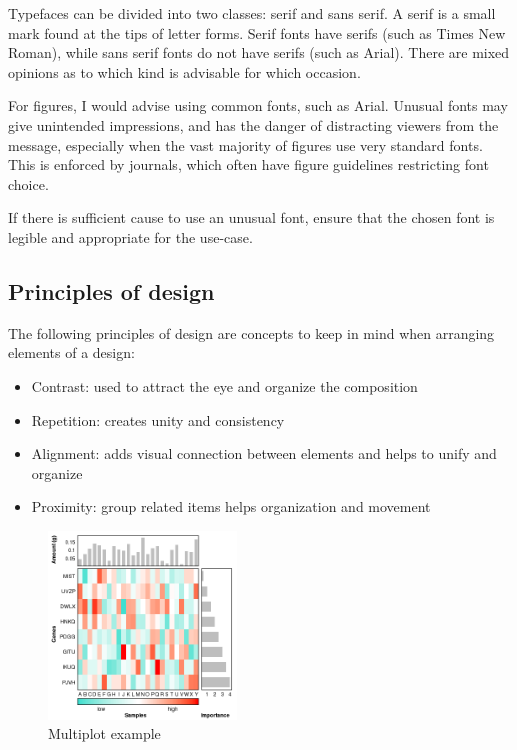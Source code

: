 \documentclass[letterpaper]{article}\usepackage[]{graphicx}\usepackage[]{color}
\begin{document}
Typefaces can be divided into two classes: serif and \textsf{sans serif}. A serif is a small mark found at the tips of letter forms. Serif fonts have serifs (such as Times New Roman), while \textsf{sans serif} fonts do not have serifs (such as Arial). There are mixed opinions as to which kind is advisable for which occasion.

For figures, I would advise using common fonts, such as Arial. Unusual fonts may give unintended impressions, and has the danger of distracting viewers from the message, especially when the vast majority of figures use very standard fonts. This is enforced by journals, which often have figure guidelines restricting font choice. 

If there is sufficient cause to use an unusual font, ensure that the chosen font is legible and appropriate for the use-case. 

\subsection{Principles of design}
The following principles of design are concepts to keep in mind when arranging elements of a design: \cite{williams}
\begin{itemize}
\item Contrast: used to attract the eye and organize the composition
\item Repetition: creates unity and consistency
\item Alignment: adds visual connection between elements and helps to unify and organize
\item Proximity: group related items helps organization and movement
\end{itemize}

\begin{figure}[!ht]
  \begin{center}
     \includegraphics[width=50mm]{Figures/Multiplot_Ex2.png}
     \caption{Multiplot example}
  \end{center}
\end{figure}
\end{document}
